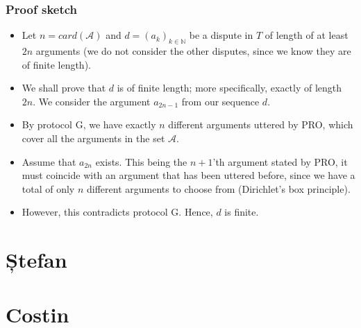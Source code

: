 \documentclass{beamer}
\begin{document}
\begin{frame}
	\frametitle{Proof sketch}
	\begin{itemize}
		\item Let $n = card(\mathcal{A})$ and $d = (a_{k})_{k \in \mathbb{N}}$ be a dispute in $T$ of length of at least $2n$ arguments (we do not consider the other disputes, since we know they are of finite length).\pause
		\item We shall prove that $d$ is of finite length; more specifically, exactly of length $2n$. We consider the argument $a_{2n - 1}$ from our sequence $d$.\pause
		\item By protocol G, we have exactly $n$ different arguments uttered by PRO, which cover all the arguments in the set $\mathcal{A}$. \pause
		\item Assume that $a_{2n}$ exists. This being the $n+1$'th argument stated by PRO, it must coincide with an argument that has been uttered before, since we have a total of only $n$ different arguments to choose from (Dirichlet's box principle). \pause
		\item However, this contradicts protocol G. Hence, $d$ is finite.
	\end{itemize}
\end{frame}

\section{Ștefan}
\section{Costin}
\end{document}
